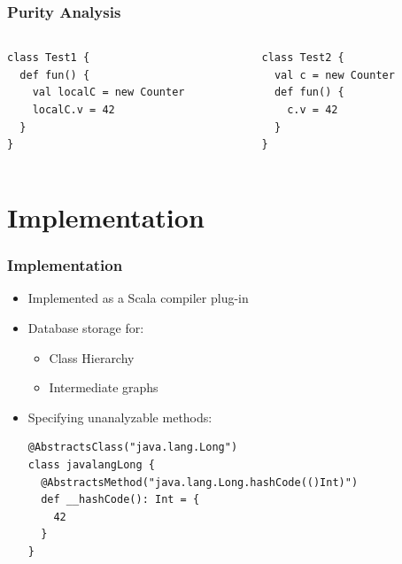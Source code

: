 \documentclass[hyperref={pdfpagelabels=false}]{beamer}
\begin{document}
\begin{frame}[fragile]
    \frametitle{Purity Analysis}
    \begin{columns}
      \begin{column}{0.4\textwidth}
\begin{lstlisting}
class Test1 {
  def fun() {
    val localC = new Counter
    localC.v = 42
  }
}
\end{lstlisting}
      \end{column}
      \begin{column}{0.6\textwidth}
\begin{lstlisting}
class Test2 {
  val c = new Counter
  def fun() {
    c.v = 42
  }
}
\end{lstlisting}
      \end{column}
    \end{columns}
\end{frame}

\section{Implementation}
\begin{frame}[fragile]
    \frametitle{Implementation}
    \begin{itemize}
        \item Implemented as a Scala compiler plug-in
        \item Database storage for:
        \begin{itemize}
            \item Class Hierarchy
            \item Intermediate  graphs
        \end{itemize}
        \item Specifying unanalyzable methods:
        \begin{lstlisting}
@AbstractsClass("java.lang.Long")
class javalangLong {
  @AbstractsMethod("java.lang.Long.hashCode(()Int)")
  def __hashCode(): Int = {
    42
  }
}
        \end{lstlisting}
    \end{itemize}

\end{frame}
\end{document}
